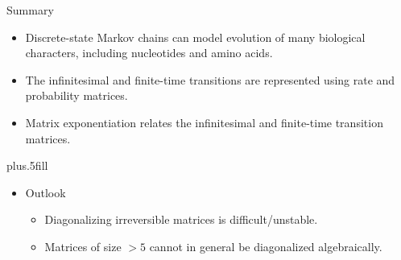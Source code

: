\documentclass{beamer}
\begin{document}
\begin{frame}{Summary}

  \begin{itemize}
  \item
    \alert{Discrete-state Markov chains} can model evolution of many biological characters, including nucleotides and amino acids.
  \item
    The infinitesimal and finite-time transitions are represented using \alert{rate and probability matrices}.
  \item
    \alert{Matrix exponentiation} relates the infinitesimal and finite-time transition matrices.
  \end{itemize}
  
  \vskip0pt plus.5fill
  \begin{itemize}
  \item
    Outlook
    \begin{itemize}
    \item
      Diagonalizing irreversible matrices is difficult/unstable.
    \item
      Matrices of size $>5$ cannot in general be diagonalized algebraically.
    \end{itemize}
  \end{itemize}
\end{frame}
\end{document}
